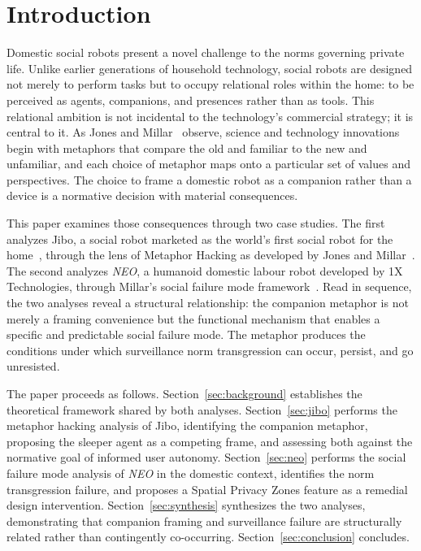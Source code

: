 \documentclass[11pt,showkeys]{../../shared/essay}
\newcommand{\neo}{\textit{NEO}}
\begin{document}
\maketitle

\section{Introduction}

Domestic social robots present a novel challenge to the norms governing private life. Unlike earlier generations of household technology, social robots are designed not merely to perform tasks but to occupy relational roles within the home: to be perceived as agents, companions, and presences rather than as tools. This relational ambition is not incidental to the technology's commercial strategy; it is central to it. As Jones and Millar~\cite{jones_hacking_2017} observe, science and technology innovations begin with metaphors that compare the old and familiar to the new and unfamiliar, and each choice of metaphor maps onto a particular set of values and perspectives. The choice to frame a domestic robot as a companion rather than a device is a normative decision with material consequences.

This paper examines those consequences through two case studies. The first analyzes Jibo, a social robot marketed as the world's first social robot for the home~\cite{breazeal_jibo_2014}, through the lens of Metaphor Hacking as developed by Jones and Millar~\cite{jones_hacking_2017}. The second analyzes \neo{}, a humanoid domestic labour robot developed by 1X Technologies, through Millar's social failure mode framework~\cite{millar_social_2020}. Read in sequence, the two analyses reveal a structural relationship: the companion metaphor is not merely a framing convenience but the functional mechanism that enables a specific and predictable social failure mode. The metaphor produces the conditions under which surveillance norm transgression can occur, persist, and go unresisted.

The paper proceeds as follows. Section~\ref{sec:background} establishes the theoretical framework shared by both analyses. Section~\ref{sec:jibo} performs the metaphor hacking analysis of Jibo, identifying the companion metaphor, proposing the sleeper agent as a competing frame, and assessing both against the normative goal of informed user autonomy. Section~\ref{sec:neo} performs the social failure mode analysis of \neo{} in the domestic context, identifies the norm transgression failure, and proposes a Spatial Privacy Zones feature as a remedial design intervention. Section~\ref{sec:synthesis} synthesizes the two analyses, demonstrating that companion framing and surveillance failure are structurally related rather than contingently co-occurring. Section~\ref{sec:conclusion} concludes.
\end{document}
